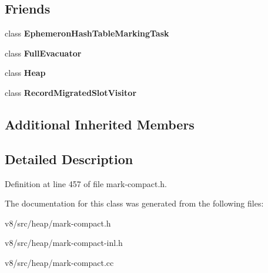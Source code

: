 \subsection*{Friends}
\begin{DoxyCompactItemize}
\item 
\mbox{\label{classv8_1_1internal_1_1MarkCompactCollector_adae8a006dc91c15419cee45dd7813631}} 
class {\bfseries Ephemeron\+Hash\+Table\+Marking\+Task}
\item 
\mbox{\label{classv8_1_1internal_1_1MarkCompactCollector_a5994699cb3b3b999d9252e2b46375b72}} 
class {\bfseries Full\+Evacuator}
\item 
\mbox{\label{classv8_1_1internal_1_1MarkCompactCollector_a3d69975be2e998e7bf2dcd1b1c8b4577}} 
class {\bfseries Heap}
\item 
\mbox{\label{classv8_1_1internal_1_1MarkCompactCollector_a9aac51e6e68df5e4add0792032864173}} 
class {\bfseries Record\+Migrated\+Slot\+Visitor}
\end{DoxyCompactItemize}
\subsection*{Additional Inherited Members}


\subsection{Detailed Description}


Definition at line 457 of file mark-\/compact.\+h.



The documentation for this class was generated from the following files\+:\begin{DoxyCompactItemize}
\item 
v8/src/heap/mark-\/compact.\+h\item 
v8/src/heap/mark-\/compact-\/inl.\+h\item 
v8/src/heap/mark-\/compact.\+cc\end{DoxyCompactItemize}
